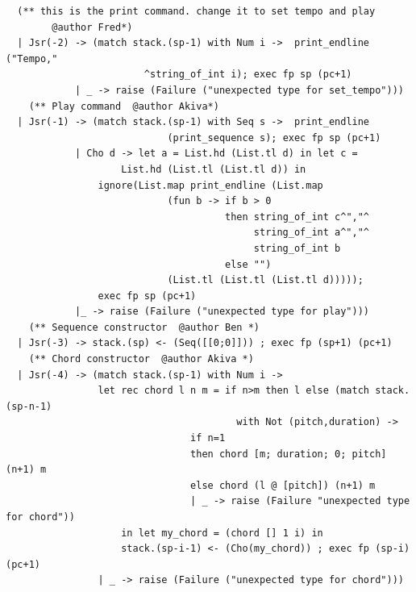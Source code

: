 \documentclass[12pt,A4]{book}
\begin{document}
\begin{verbatim}
  (** this is the print command. change it to set tempo and play 
        @author Fred*)
  | Jsr(-2) -> (match stack.(sp-1) with Num i ->  print_endline ("Tempo,"
                        ^string_of_int i); exec fp sp (pc+1)
            | _ -> raise (Failure ("unexpected type for set_tempo")))
    (** Play command  @author Akiva*)
  | Jsr(-1) -> (match stack.(sp-1) with Seq s ->  print_endline
                            (print_sequence s); exec fp sp (pc+1)
            | Cho d -> let a = List.hd (List.tl d) in let c = 
                    List.hd (List.tl (List.tl d)) in
                ignore(List.map print_endline (List.map 
                            (fun b -> if b > 0 
                                      then string_of_int c^","^
                                           string_of_int a^","^
                                           string_of_int b 
                                      else "") 
                            (List.tl (List.tl (List.tl d)))));
                exec fp sp (pc+1)
            |_ -> raise (Failure ("unexpected type for play")))
    (** Sequence constructor  @author Ben *)
  | Jsr(-3) -> stack.(sp) <- (Seq([[0;0]])) ; exec fp (sp+1) (pc+1)
    (** Chord constructor  @author Akiva *)
  | Jsr(-4) -> (match stack.(sp-1) with Num i ->
                let rec chord l n m = if n>m then l else (match stack.(sp-n-1) 
                                        with Not (pitch,duration) ->
                                if n=1 
                                then chord [m; duration; 0; pitch] (n+1) m 
                                else chord (l @ [pitch]) (n+1) m
                                | _ -> raise (Failure "unexpected type for chord"))
                    in let my_chord = (chord [] 1 i) in
                    stack.(sp-i-1) <- (Cho(my_chord)) ; exec fp (sp-i) (pc+1)
                | _ -> raise (Failure ("unexpected type for chord")))


\end{verbatim}
\end{document}
